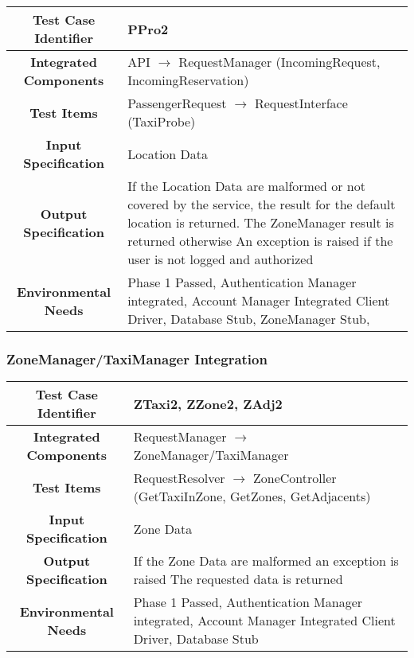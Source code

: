 \documentclass[11pt, a4paper,titlepage]{article}
\begin{document}
	 \begin{tabularx}{\textwidth}{| c|X|}
	 	\hline \textbf{Test Case Identifier} & PPro2 \\
	 	\hline \textbf{Integrated Components} & API  $\rightarrow $ RequestManager (IncomingRequest, IncomingReservation) \\
	 	\hline \textbf{Test Items} & PassengerRequest $\rightarrow $ RequestInterface (TaxiProbe) \\
	 	\hline \textbf{Input Specification} & Location Data \\
	 	\hline \textbf{Output Specification} & If the Location Data are malformed or not covered by the service, the result for the default location is returned. The ZoneManager result is returned otherwise \newline
	 	An exception is raised if the user is not logged and authorized \\
	 	\hline \textbf{Environmental Needs} &  Phase 1 Passed, Authentication Manager integrated, Account Manager Integrated \newline 
	 	Client Driver, Database Stub, ZoneManager Stub,\\
	 	\hline
	 \end{tabularx}
	 \newline
	 
	 \subsubsection{ZoneManager/TaxiManager Integration}
	 \begin{tabularx}{\textwidth}{| c|X|}
	 	\hline \textbf{Test Case Identifier} & ZTaxi2, ZZone2, ZAdj2 \\
	 	\hline \textbf{Integrated Components} & RequestManager  $\rightarrow $  ZoneManager/TaxiManager \\
	 	\hline \textbf{Test Items} & RequestResolver $\rightarrow $ ZoneController (GetTaxiInZone, GetZones, GetAdjacents) \\
	 	\hline \textbf{Input Specification} & Zone Data \\
	 	\hline \textbf{Output Specification} & If the Zone Data are malformed an exception is raised \newline
											The requested data is returned \\
	 	\hline \textbf{Environmental Needs} &  Phase 1 Passed, Authentication Manager integrated, Account Manager Integrated \newline 
	 	Client Driver, Database Stub\\
	 	\hline
	 	\end{tabularx}
	 	\newline
	 	
\end{document}
